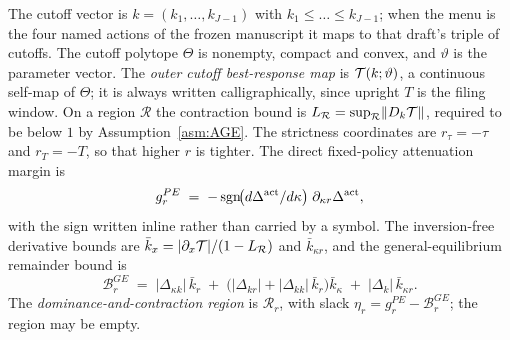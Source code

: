 \begin{definition}
\label{def:theta}
The cutoff vector is $k = (k_1,\dots,k_{J-1})$ with $k_1 \le \dots \le k_{J-1}$; when the menu is the
four named actions of the frozen manuscript it maps to that draft's triple of cutoffs. The cutoff
polytope $\Theta$ is nonempty, compact and convex, and $\vartheta$ is the parameter vector. The
\emph{outer cutoff best-response map} is $\mathcal{T}(k;\vartheta)$, a continuous self-map of $\Theta$; it
is always written calligraphically, since upright $T$ is the filing window. On a region $\mathcal R$
the contraction bound is $L_{\mathcal R} = \sup_{\mathcal R}\lVert D_k\mathcal{T}\rVert$, required to be
below $1$ by Assumption~\ref{asm:AGE}. The strictness coordinates are $r_\tau = -\tau$ and
$r_T = -T$, so that higher $r$ is tighter. The direct fixed-policy attenuation margin is
\begin{equation}
\label{eq:gPE}
g_r^{PE} \;=\; -\operatorname{sgn}\!\bigl(d\Delta^{\mathrm{act}}/d\kappa\bigr)\;\partial_{\kappa r}\Delta^{\mathrm{act}},
\end{equation}
with the sign written inline rather than carried by a symbol. The inversion-free derivative bounds
are $\bar k_x = |\partial_x\mathcal{T}|/(1-L_{\mathcal R})$ and $\bar k_{\kappa r}$, and the
general-equilibrium remainder bound is
\begin{equation}
\label{eq:BGE}
\mathcal B_r^{GE} \;=\; |\Delta_{\kappa k}|\,\bar k_r
\;+\; \bigl(|\Delta_{kr}| + |\Delta_{kk}|\,\bar k_r\bigr)\bar k_\kappa
\;+\; |\Delta_k|\,\bar k_{\kappa r}.
\end{equation}
The \emph{dominance-and-contraction region} is $\mathcal R_r$, with slack
$\eta_r = g_r^{PE} - \mathcal B_r^{GE}$; the region may be empty.
\end{definition}

